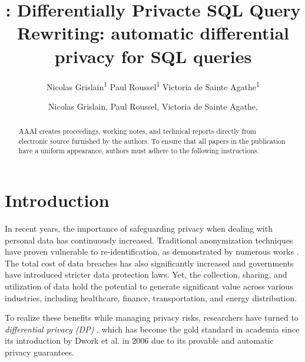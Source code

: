 \documentclass[letterpaper]{article} %
\title{\qrlew: Differentially Privacte SQL Query Rewriting}
\author{
    Nicolas Grislain\textsuperscript{\rm 1}
    Paul Roussel\textsuperscript{\rm 1}
    Victoria de Sainte Agathe\textsuperscript{\rm 1}
}
\title{\qrlew: automatic differential privacy for SQL queries}
\author {
    Nicolas Grislain,
    Paul Roussel,
    Victoria de Sainte Agathe,
}
\begin{document}
\maketitle

\begin{abstract}
AAAI creates proceedings, working notes, and technical reports directly from electronic source furnished by the authors. To ensure that all papers in the publication have a uniform appearance, authors must adhere to the following instructions.
\end{abstract}

\section{Introduction}

In recent years, the importance of safeguarding privacy when dealing with personal data has continuously increased.
Traditional anonymization techniques have proven vulnerable to re-identification, as demonstrated by numerous works \cite{archie2018s, dwork2017exposed, narayanan2008robust, sweeney2013identifying}.
The total cost of data breaches has also significantly increased \cite{ibm2023cost} and governments have introduced stricter data protection laws.
Yet, the collection, sharing, and utilization of data hold the potential to generate significant value across various industries, including healthcare, finance, transportation, and energy distribution.

To realize these benefits while managing privacy risks, researchers have turned to \emph{differential privacy (DP)} \cite{wood2018differential, dwork2014algorithmic}, which has become the gold standard in academia since its introduction by Dwork et al. in 2006 \cite{dwork2006calibrating} due to its provable and automatic privacy guarantees.
\end{document}
